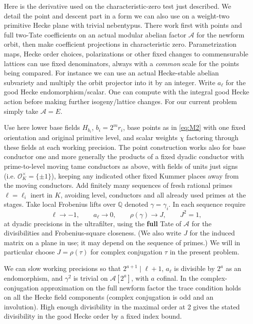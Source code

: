 Here is the derivative used on the characteristic-zero test just described. We detail the point and descent part in a form we can also use on a weight-two primitive Hecke plane with trivial nebentypus. There work first with points and full two-Tate coefficients on an actual modular abelian factor \(\mathcal A\) for the newform orbit, then make coefficient projections in characteristic zero. Parametrization maps, Hecke order choices, polarizations or other fixed changes to commensurable lattices can use fixed denominators, always with a \emph{common} scale for the points being compared. For instance we can use an actual Hecke-stable abelian subvariety and multiply the orbit projector into it by an integer. Write \(a_\ell\) for the good Hecke endomorphism/scalar. One can compute with the integral good Hecke action before making further isogeny/lattice changes. For our current problem simply take \(\mathcal A=E\).

Use here lower base fields \(H_{b_i}\), \(b_i=2^m r_i\), base points as in \eqref{eq:M2} with one fixed orientation and original primitive level, and scalar weights \(\chi\) factoring through these fields at each working precision. The point construction works also for base conductor one and more generally the products of a fixed dyadic conductor with prime-to-level moving tame conductors as above, with fields of units just signs (i.e. \(\mathcal O_K^\times=\{\pm1\}\)), keeping any indicated other fixed Kummer places away from the moving conductors. Add finitely many sequences of fresh rational primes \(\ell=\ell_i\) inert in \(K\), avoiding level, conductors and all already used primes at the stages. Take local Frobenius lifts over \(\mathbb Q\) denoted \(\gamma=\gamma_i\). In each sequence require
\[
 \ell\longrightarrow -1,\qquad a_\ell\longrightarrow0,\qquad
 \rho(\gamma)\longrightarrow J,\qquad J^2=1 ,
\]
at dyadic precisions in the ultrafilter, using the \textbf{full} Tate of \(\mathcal A\) for the divisibilities and Frobenius-square closeness. (We also write \(J\) for the induced matrix on a plane in use; it may depend on the sequence of primes.) We will in particular choose \(J=\rho(\tau)\) for complex conjugation \(\tau\) in the present problem.

We can slow working precisions so that \(2^{a+1}\mid\ell+1\), \(a_\ell\) is divisible by \(2^a\) as an endomorphism, and \(\gamma^2\) is trivial on \(\mathcal A[2^a]\), with \(a\) cofinal. In the complex-conjugation approximation on the full newform factor the trace condition holds on all the Hecke field components (complex conjugation is odd and an involution). High enough divisibility in the maximal order at 2 gives the stated divisibility in the good Hecke order by a fixed index bound.

